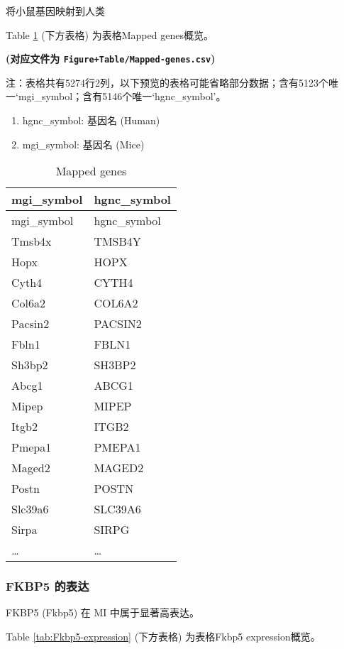 \documentclass[
]{article}
\providecommand{\tightlist}{%
  \setlength{\itemsep}{0pt}\setlength{\parskip}{0pt}}
\begin{document}
将小鼠基因映射到人类

Table \ref{tab:Mapped-genes} (下方表格) 为表格Mapped genes概览。

\textbf{(对应文件为 \texttt{Figure+Table/Mapped-genes.csv})}

\begin{center}\begin{tcolorbox}[colback=gray!10, colframe=gray!50, width=0.9\linewidth, arc=1mm, boxrule=0.5pt]注：表格共有5274行2列，以下预览的表格可能省略部分数据；含有5123个唯一`mgi\_symbol；含有5146个唯一`hgnc\_symbol'。
\end{tcolorbox}
\end{center}
\begin{center}\begin{tcolorbox}[colback=gray!10, colframe=gray!50, width=0.9\linewidth, arc=1mm, boxrule=0.5pt]\begin{enumerate}\tightlist
\item hgnc\_symbol:  基因名 (Human)
\item mgi\_symbol:  基因名 (Mice)
\end{enumerate}\end{tcolorbox}
\end{center}

\begin{longtable}[]{@{}ll@{}}
\caption{\label{tab:Mapped-genes}Mapped genes}\tabularnewline
\toprule
mgi\_symbol & hgnc\_symbol\tabularnewline
\midrule
\endfirsthead
\toprule
mgi\_symbol & hgnc\_symbol\tabularnewline
\midrule
\endhead
Tmsb4x & TMSB4Y\tabularnewline
Hopx & HOPX\tabularnewline
Cyth4 & CYTH4\tabularnewline
Col6a2 & COL6A2\tabularnewline
Pacsin2 & PACSIN2\tabularnewline
Fbln1 & FBLN1\tabularnewline
Sh3bp2 & SH3BP2\tabularnewline
Abcg1 & ABCG1\tabularnewline
Mipep & MIPEP\tabularnewline
Itgb2 & ITGB2\tabularnewline
Pmepa1 & PMEPA1\tabularnewline
Maged2 & MAGED2\tabularnewline
Postn & POSTN\tabularnewline
Slc39a6 & SLC39A6\tabularnewline
Sirpa & SIRPG\tabularnewline
\ldots{} & \ldots{}\tabularnewline
\bottomrule
\end{longtable}

\hypertarget{fkbp5-ux7684ux8868ux8fbe}{%
\subsubsection{FKBP5 的表达}\label{fkbp5-ux7684ux8868ux8fbe}}

FKBP5 (Fkbp5) 在 MI 中属于显著高表达。

Table \ref{tab:Fkbp5-expression} (下方表格) 为表格Fkbp5 expression概览。
\end{document}
